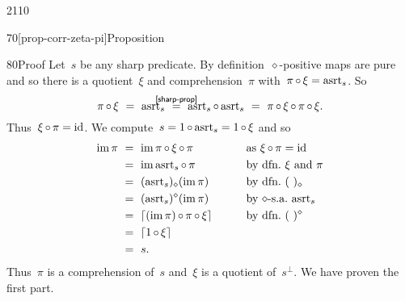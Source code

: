 \begin{parsec}{2110}
\begin{point}{70}[prop-corr-zeta-pi]{Proposition}
\begin{point}{80}{Proof}
Let~$s$ be any sharp predicate.
By definition~$\diamond$-positive maps are pure and so
    there is a quotient~$\xi$ and comprehension~$\pi$
    with~$\pi \mathop{\circ} \xi = \mathrm{asrt}_s$.
    So
\begin{equation*}
   \pi \after \xi \ =\  \asrt_s 
    \ \stackrel{\mathclap{\sref{sharp-prop}}}{=}\  \asrt_s\after\asrt_s \ =\  \pi \after \xi \after \pi \after \xi.
\end{equation*}
Thus~$\xi \mathop{\circ} \pi = \mathrm{id}$.
We compute~$s = 1 \mathop{\circ} \mathrm{asrt}_s = 1 \mathop{\circ} \xi$
and so
\begin{alignat*}{2}
    \IM \pi &\ = \ 
    \IM \pi \after \xi \after \pi &\qquad& \text{as $\xi \after \pi=\id$}\\
                  &\ = \ \IM \asrt_s \after \pi &&\text{by dfn.~$\xi$ and~$\pi$}\\
                  &\ = \ (\asrt_s)_{\diamond}(\IM \pi)&& \text{by dfn.~$(\ )_\diamond$} \\
                  & \ = \ (\asrt_s)^{\diamond}(\IM \pi)&&
        \text{by $\diamond$-s.a.~$\asrt_s$}\\
        &\ = \ \ceil{(\IM \pi) \after \pi \after \xi} && \text{by dfn.~$(\ )^\diamond$} \\
&\ = \ \ceil{1 \after \xi} \\
    & \ = \ s.
\end{alignat*}
Thus~$\pi$ is a comprehension of~$s$
and~$\xi$ is a quotient of~$s^\perp$.
We have proven the first part.


\end{point}
\end{point}
\end{parsec}
